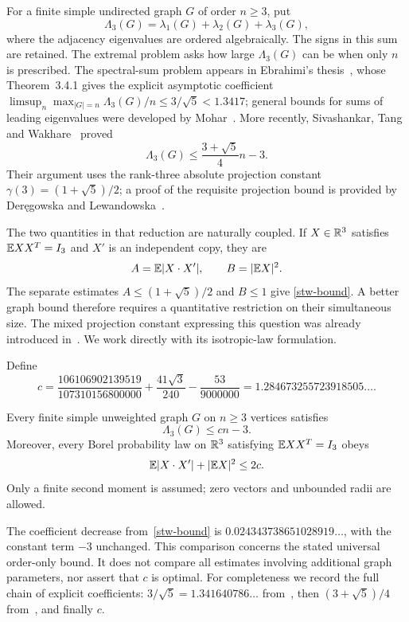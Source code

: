 For a finite simple undirected graph $G$ of order $n\ge3$, put
\[
 \Lambda_3(G)=\lambda_1(G)+\lambda_2(G)+\lambda_3(G),
\]
where the adjacency eigenvalues are ordered algebraically. The signs in
this sum are retained. The extremal problem asks how large $\Lambda_3(G)$
can be when only $n$ is prescribed. The spectral-sum problem appears in Ebrahimi's thesis~\cite{Ebrahimi},
whose Theorem~3.4.1 gives the explicit asymptotic coefficient
$\limsup_n\max_{|G|=n}\Lambda_3(G)/n\le3/\sqrt5<1.3417$;
general bounds for sums of leading eigenvalues were developed by
Mohar~\cite{Mohar}. More recently,
Sivashankar, Tang and Wakhare~\cite[Proposition 6.1]{STW} proved
\begin{equation}\label{stw-bound}
 \Lambda_3(G)\le\frac{3+\sqrt5}{4}n-3.
\end{equation}
Their argument uses the rank-three absolute projection constant
$\gamma(3)=(1+\sqrt5)/2$; a proof of the requisite projection bound is
provided by Der\k{e}gowska and Lewandowska~\cite{DL}.

The two quantities in that reduction are naturally coupled. If
$X\in\mathbb R^3$ satisfies $\mathbb E XX^T=I_3$ and $X'$ is an independent copy, they are
\[
 A=\mathbb E|X\cdot X'|,\qquad B=|\mathbb E X|^2.
\]
The separate estimates $A\le(1+\sqrt5)/2$ and $B\le1$ give
\eqref{stw-bound}. A better graph bound therefore requires a quantitative
restriction on their simultaneous size. The mixed projection constant
expressing this question was already introduced in~\cite[Section 6.2]{STW}.
We work directly with its isotropic-law formulation.

Define
\begin{equation}\label{main-constant}
 c=\frac{106106902139519}{107310156800000}
       +\frac{41\sqrt3}{240}-\frac{53}{9000000}
   =1.284673255723918505\ldots.
\end{equation}
\begin{theorem}\label{main}
Every finite simple unweighted graph $G$ on $n\ge3$ vertices satisfies
\begin{equation}\label{main-bound}
 \Lambda_3(G)\le cn-3.
\end{equation}
Moreover, every Borel probability law on $\mathbb R^3$ satisfying
$\mathbb E XX^T=I_3$ obeys
\begin{equation}\label{law-bound}
 \mathbb E|X\cdot X'|+|\mathbb E X|^2\le2c.
\end{equation}
Only a finite second moment is assumed; zero vectors and unbounded radii
are allowed.
\end{theorem}
The coefficient decrease from~\eqref{stw-bound} is
$0.024343738651028919\ldots$, with the constant term $-3$ unchanged.
This comparison concerns the stated universal order-only bound. It does
not compare all estimates involving additional graph parameters, nor
assert that $c$ is optimal. For completeness we record the full chain of
explicit coefficients: $3/\sqrt5=1.341640786\ldots$
from~\cite[Theorem~3.4.1]{Ebrahimi}, then $(3+\sqrt5)/4$
from~\cite[Proposition~6.1]{STW}, and finally $c$.

